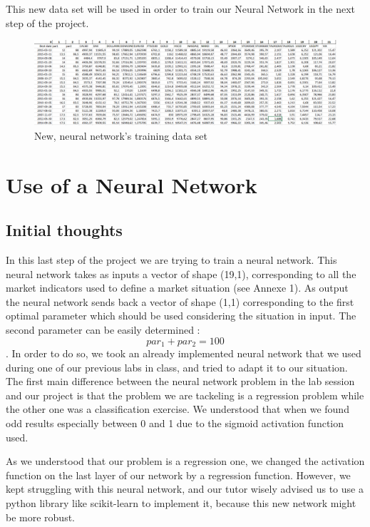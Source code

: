 \documentclass[]{article}
\begin{document}
\vskip 0.5cm
This new data set will be used in order to train our Neural Network in the next step of the project. 

\begin{figure}[hbt!]
	\center{}
	\includegraphics[scale=0.35]{image/training_set.png}
	\caption{New, neural network's training data set}
\end{figure}


\section{Use of a Neural Network}
\subsection{Initial thoughts}
\vskip 0.5cm
In this last step of the project we are trying to train a neural network. This neural network takes as inputs a vector of shape (19,1), corresponding to all the market indicators used to define a market situation (see Annexe 1). As output the neural network sends back a vector of shape (1,1) corresponding to the first optimal parameter which should be used considering the situation in input. The second parameter can be easily determined : \[par_{1} + par_{2} = 100\].
\vskip 0.5cm
In order to do so, we took an already implemented neural network that we used during one of our previous labs in class, and tried to adapt it to our situation. \\
The first main difference between the neural network problem in the lab session and our project is that the problem we are tackeling is a regression problem while the other one was a classification exercise. We understood that when we found odd results especially between 0 and 1 due to the sigmoid activation function used.

\vskip 0.5cm
As we understood that our problem is a regression one, we changed the activation function on the last layer of our network by a regression function. However, we kept struggling  with this neural network, and our tutor wisely advised us to use a python library like scikit-learn to implement it, because this new network might be more robust.
\end{document}
